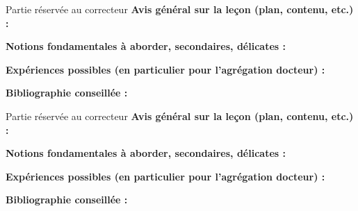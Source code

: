 \begin{reportBlock}{Partie réservée au correcteur}
  \textbf{Avis général sur la leçon (plan, contenu, etc.) :}
  
  
  \textbf{Notions fondamentales à aborder, secondaires, délicates :}
  
  
  \textbf{Expériences possibles (en particulier pour l'agrégation docteur) :}
  
  
  \textbf{Bibliographie conseillée :}
\end{reportBlock}


\begin{reportBlock}{Partie réservée au correcteur}
  \textbf{Avis général sur la leçon (plan, contenu, etc.) :}
  
  
  \textbf{Notions fondamentales à aborder, secondaires, délicates :}
  
  
  \textbf{Expériences possibles (en particulier pour l'agrégation docteur) :}
  
  
  \textbf{Bibliographie conseillée :}
\end{reportBlock}